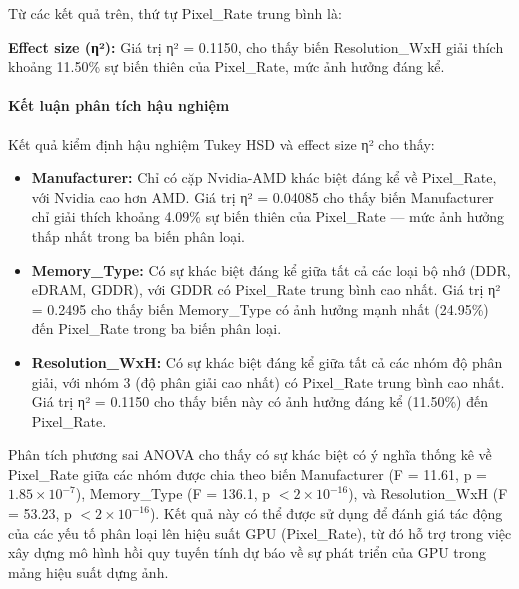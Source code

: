 Từ các kết quả trên, thứ tự Pixel\_Rate trung bình là:
\begin{center}
\end{center}

\textbf{Effect size (η²):} Giá trị η² = 0.1150, cho thấy biến Resolution\_WxH giải thích khoảng 11.50\% sự biến thiên của Pixel\_Rate, mức ảnh hưởng đáng kể.

\paragraph{Kết luận phân tích hậu nghiệm}

Kết quả kiểm định hậu nghiệm Tukey HSD và effect size η² cho thấy:
\begin{itemize}
    \item \textbf{Manufacturer:} Chỉ có cặp Nvidia-AMD khác biệt đáng kể về Pixel\_Rate, với Nvidia cao hơn AMD. Giá trị η² = 0.04085 cho thấy biến Manufacturer chỉ giải thích khoảng 4.09\% sự biến thiên của Pixel\_Rate --- mức ảnh hưởng thấp nhất trong ba biến phân loại.
    \item \textbf{Memory\_Type:} Có sự khác biệt đáng kể giữa tất cả các loại bộ nhớ (DDR, eDRAM, GDDR), với GDDR có Pixel\_Rate trung bình cao nhất. Giá trị η² = 0.2495 cho thấy biến Memory\_Type có ảnh hưởng mạnh nhất (24.95\%) đến Pixel\_Rate trong ba biến phân loại.
    \item \textbf{Resolution\_WxH:} Có sự khác biệt đáng kể giữa tất cả các nhóm độ phân giải, với nhóm 3 (độ phân giải cao nhất) có Pixel\_Rate trung bình cao nhất. Giá trị η² = 0.1150 cho thấy biến này có ảnh hưởng đáng kể (11.50\%) đến Pixel\_Rate.
\end{itemize}
    
Phân tích phương sai ANOVA cho thấy có sự khác biệt có ý nghĩa thống kê về Pixel\_Rate giữa các nhóm được chia theo biến Manufacturer (F = 11.61, p = $1.85 \times 10^{-7}$), Memory\_Type (F = 136.1, p $< 2 \times 10^{-16}$), và Resolution\_WxH (F = 53.23, p $< 2 \times 10^{-16}$). Kết quả này có thể được sử dụng để đánh giá tác động của các yếu tố phân loại lên hiệu suất GPU (Pixel\_Rate), từ đó hỗ trợ trong việc xây dựng mô hình hồi quy tuyến tính dự báo về sự phát triển của GPU trong mảng hiệu suất dựng ảnh.
